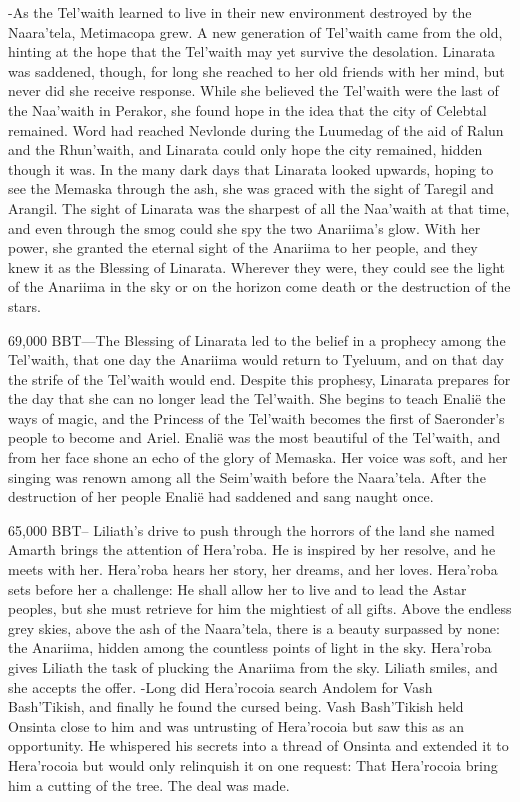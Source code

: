 \documentclass[smalldemyvopaper,11pt,twoside,onecolumn,openright,extrafontsizes]{memoir}
\begin{document}
-As the Tel’waith learned to live in their new environment destroyed by the Naara’tela, Metimacopa grew. A new generation of Tel’waith came from the old, hinting at the hope that the Tel’waith may yet survive the desolation. Linarata was saddened, though, for long she reached to her old friends with her mind, but never did she receive response. While she believed the Tel’waith were the last of the Naa’waith in Perakor, she found hope in the idea that the city of Celebtal remained. Word had reached Nevlonde during the Luumedag of the aid of Ralun and the Rhun’waith, and Linarata could only hope the city remained, hidden though it was. In the many dark days that Linarata looked upwards, hoping to see the Memaska through the ash, she was graced with the sight of Taregil and Arangil. The sight of Linarata was the sharpest of all the Naa’waith at that time, and even through the smog could she spy the two Anariima’s glow. With her power, she granted the eternal sight of the Anariima to her people, and they knew it as the Blessing of Linarata. Wherever they were, they could see the light of the Anariima in the sky or on the horizon come death or the destruction of the stars.

69,000 BBT—The Blessing of Linarata led to the belief in a prophecy among the Tel’waith, that one day the Anariima would return to Tyeluum, and on that day the strife of the Tel’waith would end. Despite this prophesy, Linarata prepares for the day that she can no longer lead the Tel’waith. She begins to teach Enalië the ways of magic, and the Princess of the Tel’waith becomes the first of Saeronder’s people to become and Ariel. Enalië was the most beautiful of the Tel’waith, and from her face shone an echo of the glory of Memaska. Her voice was soft, and her singing was renown among all the Seim’waith before the Naara’tela. After the destruction of her people Enalië had saddened and sang naught once.

65,000 BBT-- Liliath’s drive to push through the horrors of the land she named Amarth brings the attention of Hera’roba. He is inspired by her resolve, and he meets with her. Hera’roba hears her story, her dreams, and her loves. Hera’roba sets before her a challenge: He shall allow her to live and to lead the Astar peoples, but she must retrieve for him the mightiest of all gifts. Above the endless grey skies, above the ash of the Naara’tela, there is a beauty surpassed by none: the Anariima, hidden among the countless points of light in the sky. Hera’roba gives Liliath the task of plucking the Anariima from the sky. Liliath smiles, and she accepts the offer.
-Long did Hera’rocoia search Andolem for Vash Bash’Tikish, and finally he found the cursed being. Vash Bash’Tikish held Onsinta close to him and was untrusting of Hera’rocoia but saw this as an opportunity. He whispered his secrets into a thread of Onsinta and extended it to Hera’rocoia but would only relinquish it on one request: That Hera’rocoia bring him a cutting of the tree. The deal was made.
\end{document}
